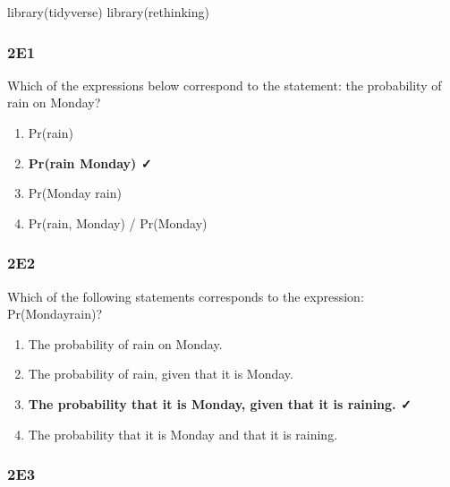 \documentclass[
]{book}
\newenvironment{Shaded}{\begin{snugshade}}{\end{snugshade}}
\newcommand{\FunctionTok}[1]{\textcolor[rgb]{0.00,0.00,0.00}{#1}}
\newcommand{\NormalTok}[1]{#1}
\providecommand{\tightlist}{%
  \setlength{\itemsep}{0pt}\setlength{\parskip}{0pt}}
\begin{document}
\begin{Shaded}
\begin{Highlighting}[]
\FunctionTok{library}\NormalTok{(tidyverse)}
\FunctionTok{library}\NormalTok{(rethinking)}
\end{Highlighting}
\end{Shaded}

\hypertarget{e1}{%
\subsubsection*{2E1}\label{e1}}

Which of the expressions below correspond to the statement: the probability of rain on Monday?

\begin{enumerate}
\def\labelenumi{\arabic{enumi}.}
\tightlist
\item
  Pr(rain)
\item
  \textbf{Pr(rain \textbar{} Monday) ✓}
\item
  Pr(Monday \textbar{} rain)
\item
  Pr(rain, Monday) / Pr(Monday)
\end{enumerate}

\hypertarget{e2}{%
\subsubsection*{2E2}\label{e2}}

Which of the following statements corresponds to the expression: Pr(Monday\textbar rain)?

\begin{enumerate}
\def\labelenumi{\arabic{enumi}.}
\tightlist
\item
  The probability of rain on Monday.
\item
  The probability of rain, given that it is Monday.
\item
  \textbf{The probability that it is Monday, given that it is raining. ✓}
\item
  The probability that it is Monday and that it is raining.
\end{enumerate}

\hypertarget{e3}{%
\subsubsection*{2E3}\label{e3}}
\end{document}
